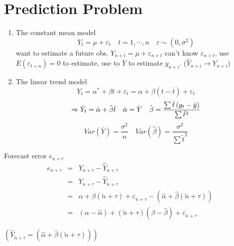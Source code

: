 \documentclass{article}
\begin{document}
\setcounter{part}{5} \setcounter{page}{21}

\part{Prediction Problem}

\begin{enumerate}
\item The constant mean model%
\begin{equation*}
Y_{t}=\mu +\varepsilon _{t}\quad t=1,\cdots ,n\quad \varepsilon \sim \left(
0,\sigma ^{2}\right)
\end{equation*}%
want to estimate a future obs. $Y_{n+t}=\mu +\varepsilon _{n+t}$ can't know $%
\varepsilon _{n+t}$, use $E\left( \varepsilon _{t+n}\right) =0$ to estimate,
use to $\bar{Y}$ to estimate $y_{n+i}$. ($\hat{Y}_{n+i}\rightarrow Y_{n+i}$)

\item The linear trend model%
\begin{equation*}
Y_{t}=\alpha ^{\ast }+\beta t+\varepsilon _{t}=\alpha +\beta \left( t-\bar{t}%
\right) +\varepsilon _{t}
\end{equation*}%
\begin{equation*}
\Rightarrow \hat{Y}_{t}=\hat{\alpha}+\hat{\beta}\tilde{t}\quad \hat{\alpha}=%
\bar{Y}\quad \hat{\beta}=\frac{\sum \tilde{t}\left( y_{t}-\bar{y}\right) }{%
\sum \tilde{t}^{2}}
\end{equation*}%
\begin{equation*}
Var\left( \bar{Y}\right) =\frac{\sigma ^{2}}{n}\quad Var\left( \hat{\beta}%
\right) =\frac{\sigma ^{2}}{\sum \tilde{t}^{2}}
\end{equation*}
\end{enumerate}

\bigskip

Forecast error $e_{n+\tau }$%
\begin{eqnarray*}
e_{n+\tau } &=&Y_{n+\tau }-\hat{Y}_{n+\tau } \\
&=&Y_{\tilde{n}+\tau }-\hat{Y}_{\tilde{n}+\tau } \\
&=&\alpha +\beta \left( \tilde{n}+\tau \right) +\varepsilon _{\tilde{n}+\tau
}-\left( \hat{\alpha}+\hat{\beta}\left( \tilde{n}+\tau \right) \right) \\
&=&\left( \alpha -\hat{\alpha}\right) +\left( \tilde{n}+\tau \right) \left(
\beta -\hat{\beta}\right) +\varepsilon _{\tilde{n}+\tau }
\end{eqnarray*}

$\left( \hat{Y}_{\tilde{n}+\tau }=\left( \hat{\alpha}+\hat{\beta}\left( 
\tilde{n}+\tau \right) \right) \right) $
\end{document}
